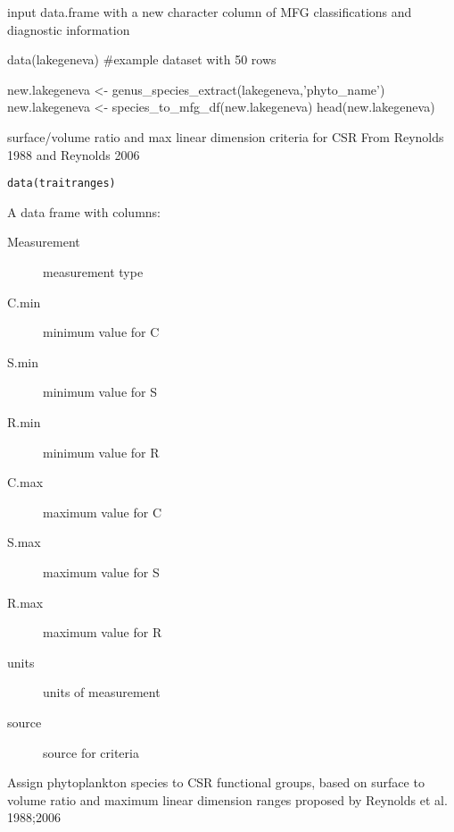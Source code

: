 \documentclass[a4paper]{book}
\begin{document}
%
\begin{Value}
input data.frame with a new character column of MFG classifications
and diagnostic information
\end{Value}
%
\begin{Examples}
\begin{ExampleCode}
data(lakegeneva)
#example dataset with 50 rows

new.lakegeneva <- genus_species_extract(lakegeneva,'phyto_name')
new.lakegeneva <- species_to_mfg_df(new.lakegeneva)
head(new.lakegeneva)
\end{ExampleCode}
\end{Examples}
%
\begin{Description}\relax
surface/volume ratio and max linear dimension criteria for CSR
From Reynolds 1988 and Reynolds 2006
\end{Description}
%
\begin{Usage}
\begin{verbatim}
data(traitranges)
\end{verbatim}
\end{Usage}
%
\begin{Format}
A data frame with columns:
\begin{description}

\item[Measurement] measurement type
\item[C.min] minimum value for C
\item[S.min] minimum value for S
\item[R.min] minimum value for R
\item[C.max] maximum value for C
\item[S.max] maximum value for S
\item[R.max] maximum value for R
\item[units] units of measurement
\item[source] source for criteria

\end{description}

\end{Format}
%
\begin{Description}\relax
Assign phytoplankton species to CSR functional groups, based on surface to volume ratio and
maximum linear dimension ranges proposed by Reynolds et al. 1988;2006
\end{Description}
\end{document}
